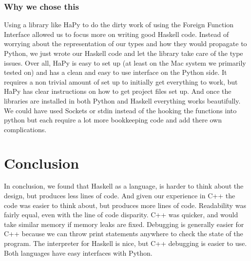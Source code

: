 \documentclass[12pt]{article}
\begin{document}
        \subsubsection{Why we chose this}
            Using a library like HaPy to do the dirty work of using the Foreign Function Interface
            allowed us to focus more on writing good Haskell code. Instead of worrying about 
            the representation of our types and how they would propagate to Python, we just wrote
            our Haskell code and let the library take care of the type issues. Over all, HaPy is
            easy to set up (at least on the Mac system we primarily tested on) and has a clean
            and easy to use interface on the Python side. It requires a non trivial amount
            of set up to initially get everything to work, but HaPy has clear instructions
            on how to get project files set up. And once the libraries are installed in both
            Python and Haskell everything works beautifully. 
            We could have used Sockets or stdin instead of the hooking the functions into 
            python but each require a lot more bookkeeping code and add there own complications.


\section{Conclusion}
    In conclusion, we found that Haskell as a language, is harder to think about the design,
    but produces less lines of code. And given our experience in C++ the code was easier to
    think about, but produces more lines of code. Readability was fairly equal, even with the line
    of code disparity. C++ was quicker, and would take similar memory if memory leaks are fixed.
    Debugging is generally easier for C++ because we can throw print statements anywhere to check 
    the state of the program. The interpreter for Haskell is nice, but C++ debugging is 
    easier to use. Both languages have easy interfaces with Python. 
    
\end{document}
